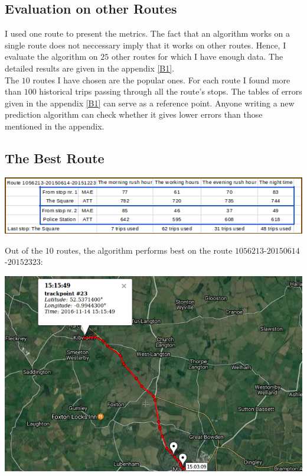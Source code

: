 \documentclass[12pt,a4paper,oneside,openright]{report}
\begin{document}
\subsection{Evaluation on other Routes}

I used one route to present the metrics. The fact that an algorithm works on a single route
does not neccessary imply that it works on other routes. Hence, I evaluate the algorithm on
$25$ other routes for which I have enough data. The
detailed results are given in the appendix \ref{B1}. \\

The $10$ routes I have chosen are the popular ones. For each route I found
more than $100$ historical trips passing through all the route's stops. The tables of
errors given in the appendix \ref{B1} can serve as a reference point. Anyone writing a
new prediction algorithm can check whether it gives lower errors than those mentioned
in the appendix.

\subsection*{The Best Route}

\includegraphics[width=\textwidth]{figs/table_of_1056213.png}

Out of the $10$ routes, the algorithm performs best on the route
$1056213$-$20150614$-$20152323$:

\includegraphics[scale=0.65]{figs/best_route.png}
\end{document}

